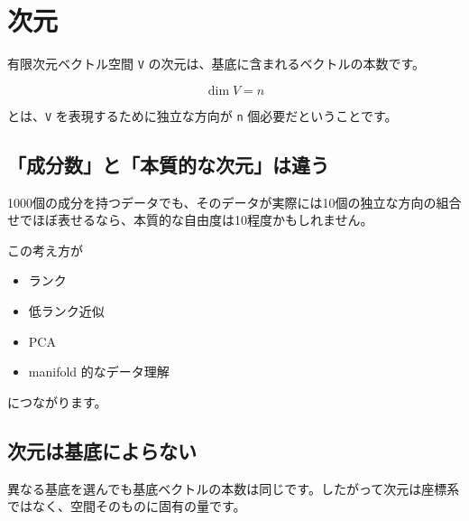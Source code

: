 \documentclass[
  11pt,
  a4paper,
]{ltjsarticle}
\author{}
\date{}
\providecommand{\tightlist}{%
  \setlength{\itemsep}{0pt}\setlength{\parskip}{0pt}}
\begin{document}
\hypertarget{ux6b21ux5143}{%
\section{次元}\label{ux6b21ux5143}}

有限次元ベクトル空間 \texttt{V}
の次元は、基底に含まれるベクトルの本数です。

\[
\dim V=n
\]

とは、\texttt{V} を表現するために独立な方向が \texttt{n}
個必要だということです。

\hypertarget{ux6210ux5206ux6570ux3068ux672cux8ceaux7684ux306aux6b21ux5143ux306fux9055ux3046}{%
\subsection{「成分数」と「本質的な次元」は違う}\label{ux6210ux5206ux6570ux3068ux672cux8ceaux7684ux306aux6b21ux5143ux306fux9055ux3046}}

1000個の成分を持つデータでも、そのデータが実際には10個の独立な方向の組合せでほぼ表せるなら、本質的な自由度は10程度かもしれません。

この考え方が

\begin{itemize}
\tightlist
\item
  ランク
\item
  低ランク近似
\item
  PCA
\item
  manifold 的なデータ理解
\end{itemize}

につながります。

\hypertarget{ux6b21ux5143ux306fux57faux5e95ux306bux3088ux3089ux306aux3044}{%
\subsection{次元は基底によらない}\label{ux6b21ux5143ux306fux57faux5e95ux306bux3088ux3089ux306aux3044}}

異なる基底を選んでも基底ベクトルの本数は同じです。したがって次元は座標系ではなく、空間そのものに固有の量です。
\end{document}
